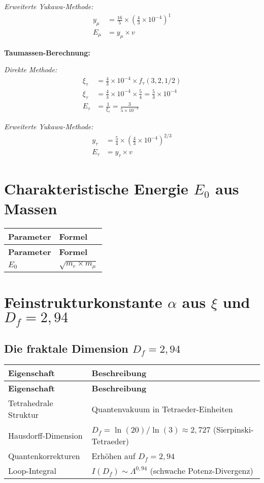 \documentclass[12pt,a4paper]{article}
\begin{document}
	\textit{Erweiterte Yukawa-Methode:}
	\begin{align}
		y_\mu &= \frac{16}{5} \times \left(\frac{4}{3} \times 10^{-4}\right)^1 \\
		E_\mu &= y_\mu \times v
	\end{align}
	
	\textbf{Taumassen-Berechnung:}
	
	\textit{Direkte Methode:}
	\begin{align}
		\xi_\tau &= \frac{4}{3} \times 10^{-4} \times f_\tau(3,2,1/2) \\
		\xi_\tau &= \frac{4}{3} \times 10^{-4} \times \frac{5}{4} = \frac{5}{3} \times 10^{-4} \\
		E_{\tau} &= \frac{1}{\xi_\tau} = \frac{3}{5 \times 10^{-4}}
	\end{align}
	
	\textit{Erweiterte Yukawa-Methode:}
	\begin{align}
		y_\tau &= \frac{5}{4} \times \left(\frac{4}{3} \times 10^{-4}\right)^{2/3} \\
		E_\tau &= y_\tau \times v
	\end{align}
	
	\section{Charakteristische Energie \(E_0\) aus Massen}
	
	\begin{longtable}{|p{3cm}|p{4cm}|}
		\hline
		\textbf{Parameter} & \textbf{Formel} \\
		\hline
		\endfirsthead
		\hline
		\textbf{Parameter} & \textbf{Formel} \\
		\hline
		\endhead
		\(E_0\) & \(\sqrt{m_e \times m_{\mu}}\) \\
		\hline
	\end{longtable}
	

\section{Feinstrukturkonstante \(\alpha\) aus \(\xi\) und \(D_f = 2{,}94\)}

\subsection{Die fraktale Dimension \(D_f = 2{,}94\)}

\begin{longtable}{|p{4cm}|p{6cm}|}
	\hline
	\textbf{Eigenschaft} & \textbf{Beschreibung} \\
	\hline
	\endfirsthead
	\hline
	\textbf{Eigenschaft} & \textbf{Beschreibung} \\
	\hline
	\endhead
	Tetrahedrale Struktur & Quantenvakuum in Tetraeder-Einheiten \\
	\hline
	Hausdorff-Dimension & \(D_f = \ln(20)/\ln(3) \approx 2{,}727\) (Sierpinski-Tetraeder) \\
	\hline
	Quantenkorrekturen & Erhöhen auf \(D_f = 2{,}94\) \\
	\hline
	Loop-Integral & \(I(D_f) \sim \Lambda^{0{,}94}\) (schwache Potenz-Divergenz) \\
	\hline
\end{longtable}
\end{document}
